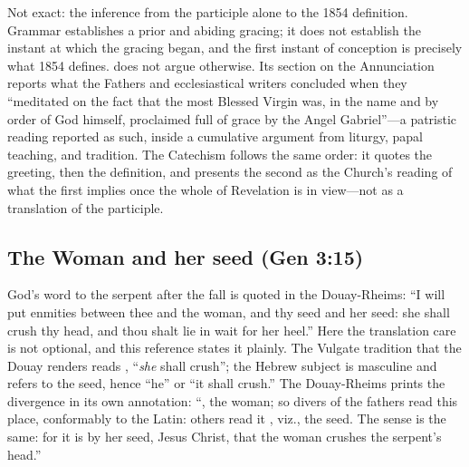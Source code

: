 Not exact: the inference from the participle alone to the 1854
definition. Grammar establishes a prior and abiding gracing; it does not
establish the instant at which the gracing began, and the first instant
of conception is precisely what 1854 defines. 
does not argue otherwise. Its section on the Annunciation reports what
the Fathers and ecclesiastical writers concluded when they ``meditated on
the fact that the most Blessed Virgin was, in the name and by order of
God himself, proclaimed full of grace by the Angel Gabriel''---a
patristic reading reported as such, inside a cumulative argument from
liturgy, papal teaching, and tradition. The Catechism
follows the same order: it quotes the greeting, then the definition,
and presents the second as the Church's reading of what the first
implies once the whole of Revelation is in view---not as a translation
of the participle.

\subsection*{The Woman and her seed (Gen 3:15)}

God's word to the serpent after the fall is quoted in the Douay-Rheims:
``I will put enmities between thee and the woman, and thy seed and her
seed: she shall crush thy head, and thou shalt lie in wait for her
heel.'' Here the translation care is
not optional, and this reference states it plainly. The Vulgate tradition
that the Douay renders reads , ``\emph{she} shall
crush''; the Hebrew subject is masculine and refers to the seed, hence
``he'' or ``it shall crush.'' The Douay-Rheims prints the divergence in
its own annotation: ``, the woman; so divers of the fathers
read this place, conformably to the Latin: others read it ,
viz., the seed. The sense is the same: for it is by her seed, Jesus
Christ, that the woman crushes the serpent's head.''


